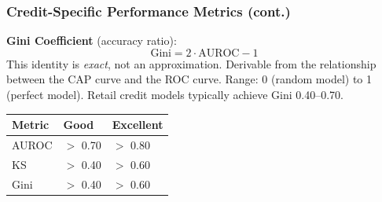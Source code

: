 \documentclass[9pt,t]{beamer}
\begin{document}
\begin{frame}
\frametitle{Credit-Specific Performance Metrics (cont.)}

\begin{underhood}
\textbf{Gini Coefficient} (accuracy ratio):
\[
  \text{Gini} = 2 \cdot \text{AUROC} - 1
\]
This identity is \emph{exact}, not an approximation. Derivable from the relationship between
the CAP curve and the ROC curve. Range: 0 (random model) to 1 (perfect model).
Retail credit models typically achieve Gini 0.40--0.70.
\end{underhood}

\medskip
\begin{center}
\begin{tabular}{lll}
\toprule
Metric & Good & Excellent \\
\midrule
AUROC & $>$ 0.70 & $>$ 0.80 \\
KS & $>$ 0.40 & $>$ 0.60 \\
Gini & $>$ 0.40 & $>$ 0.60 \\
\bottomrule
\end{tabular}
\end{center}
\end{frame}
\end{document}
